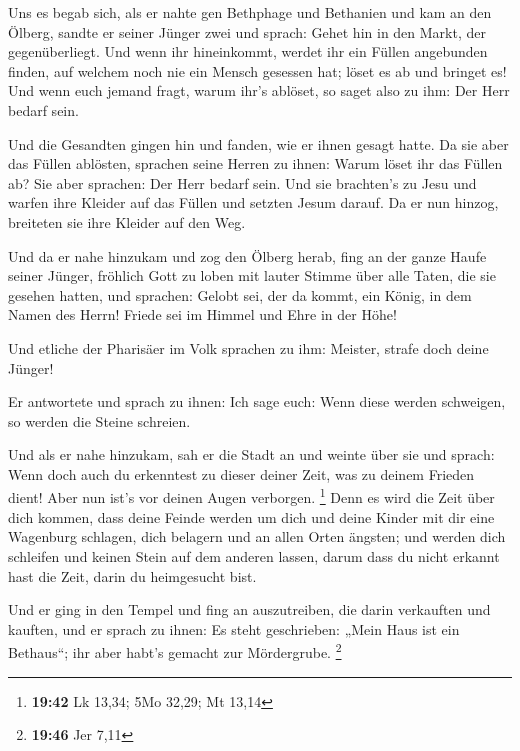 Uns es begab sich, als er nahte gen Bethphage und
Bethanien und kam an den Ölberg, sandte er seiner Jünger zwei
 und sprach: Gehet hin in den Markt, der gegenüberliegt.
Und wenn ihr hineinkommt, werdet ihr ein Füllen angebunden finden, auf
welchem noch nie ein Mensch gesessen hat; löset es ab und bringet es!
 Und wenn euch jemand fragt, warum ihr's ablöset, so
saget also zu ihm: Der Herr bedarf sein.

 Und die Gesandten gingen hin und fanden, wie er ihnen
gesagt hatte.  Da sie aber das Füllen ablösten, sprachen
seine Herren zu ihnen: Warum löset ihr das Füllen ab? 
Sie aber sprachen: Der Herr bedarf sein.  Und sie
brachten's zu Jesu und warfen ihre Kleider auf das Füllen und setzten
Jesum darauf.  Da er nun hinzog, breiteten sie ihre
Kleider auf den Weg.

 Und da er nahe hinzukam und zog den Ölberg herab, fing
an der ganze Haufe seiner Jünger, fröhlich Gott zu loben mit lauter
Stimme über alle Taten, die sie gesehen hatten,  und
sprachen: Gelobt sei, der da kommt, ein König, in dem Namen des Herrn!
Friede sei im Himmel und Ehre in der Höhe!

 Und etliche der Pharisäer im Volk sprachen zu ihm:
Meister, strafe doch deine Jünger!

 Er antwortete und sprach zu ihnen: Ich sage euch: Wenn
diese werden schweigen, so werden die Steine schreien.

 Und als er nahe hinzukam, sah er die Stadt an und weinte
über sie  und sprach: Wenn doch auch du erkenntest zu
dieser deiner Zeit, was zu deinem Frieden dient! Aber nun ist's vor
deinen Augen verborgen. \footnote{\textbf{19:42} Lk 13,34; 5Mo 32,29; Mt
  13,14}  Denn es wird die Zeit über dich kommen, dass
deine Feinde werden um dich und deine Kinder mit dir eine Wagenburg
schlagen, dich belagern und an allen Orten ängsten;  und
werden dich schleifen und keinen Stein auf dem anderen lassen, darum
dass du nicht erkannt hast die Zeit, darin du heimgesucht bist.

 Und er ging in den Tempel und fing an auszutreiben, die
darin verkauften und kauften,  und er sprach zu ihnen: Es
steht geschrieben: „Mein Haus ist ein Bethaus``; ihr aber habt's gemacht
zur Mördergrube. \footnote{\textbf{19:46} Jer 7,11}

